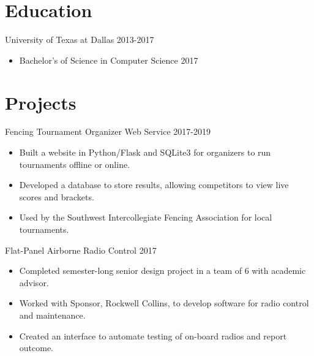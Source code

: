 \documentclass[line,margin]{res}
\begin{document}
\begin{resume}
\vspace{-4pt}
\section{Education}
\vspace{12pt}
University of Texas at Dallas \hfill 2013-2017 \\
\vspace{-12pt}
\begin{itemize} \itemsep -2pt
	\item Bachelor's of Science in Computer Science 2017
\end{itemize}

\vspace{-4pt}
\section{Projects}
\vspace{12pt}


Fencing Tournament Organizer Web Service
\hfill 2017-2019
	\begin{itemize} \itemsep -2pt
		\item Built a website in Python/Flask and SQLite3 for organizers to run tournaments offline or online.
		\item Developed a database to store results, allowing competitors to view live scores and brackets.
		\item Used by the Southwest Intercollegiate Fencing Association for local tournaments.
	\end{itemize}

\vspace{-6pt}
Flat-Panel Airborne Radio Control
\hfill 2017
	\begin{itemize} \itemsep -2pt
		\item Completed semester-long senior design project in a team of 6 with academic advisor.
		\item Worked with Sponsor, Rockwell Collins, to develop software for radio control and maintenance.
		\item Created an interface to automate testing of on-board radios and report outcome.
	\end{itemize}


\end{resume}
\end{document}
